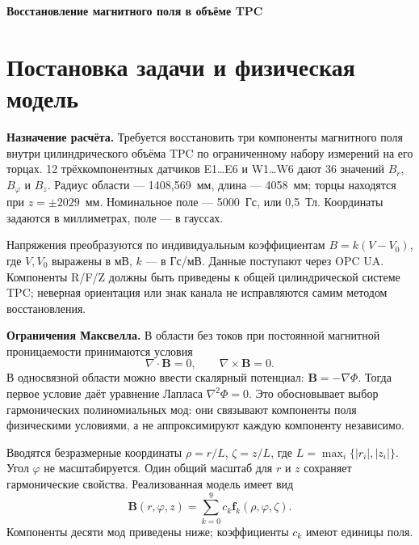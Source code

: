 \documentclass[a4paper,11pt]{article}
\begin{document}
{\Large\bfseries Восстановление магнитного поля в объёме TPC\par}
\vspace{4pt}

\section{Постановка задачи и физическая модель}

\textbf{Назначение расчёта.} Требуется восстановить три компоненты магнитного
поля внутри цилиндрического объёма TPC по ограниченному набору измерений
на его торцах. 12 трёхкомпонентных датчиков E1\ldots E6 и W1\ldots W6
дают 36 значений $B_r$, $B_\varphi$ и $B_z$. Радиус области — 1408,569~мм,
длина — 4058~мм; торцы находятся при $z=\pm2029$~мм. Номинальное поле —
5000~Гс, или 0,5~Тл. Координаты задаются в миллиметрах, поле — в гауссах.

Напряжения преобразуются по индивидуальным коэффициентам
$B=k(V-V_0)$, где $V,V_0$ выражены в мВ, $k$ — в Гс/мВ.
Данные поступают через OPC UA. Компоненты R/F/Z должны быть приведены
к общей цилиндрической системе TPC; неверная ориентация или знак канала
не исправляются самим методом восстановления.

\textbf{Ограничения Максвелла.} В области без токов при постоянной магнитной
проницаемости принимаются условия
\[
 \nabla\cdot\mathbf B=0,\qquad \nabla\times\mathbf B=0.
\]
В односвязной области можно ввести скалярный потенциал:
$\mathbf B=-\nabla\Phi$. Тогда первое условие даёт уравнение Лапласа
$\nabla^2\Phi=0$. Это обосновывает выбор гармонических полиномиальных мод:
они связывают компоненты поля физическими условиями, а не аппроксимируют
каждую компоненту независимо.

Вводятся безразмерные координаты $\rho=r/L$, $\zeta=z/L$,
где $L=\max_i\{|r_i|,|z_i|\}$. Угол $\varphi$ не масштабируется.
Один общий масштаб для $r$ и $z$ сохраняет гармонические свойства.
Реализованная модель имеет вид
\[
 \mathbf B(r,\varphi,z)=\sum_{k=0}^{9}c_k\mathbf f_k(\rho,\varphi,\zeta).
\]
Компоненты десяти мод приведены ниже; коэффициенты $c_k$ имеют единицы поля.
\end{document}
